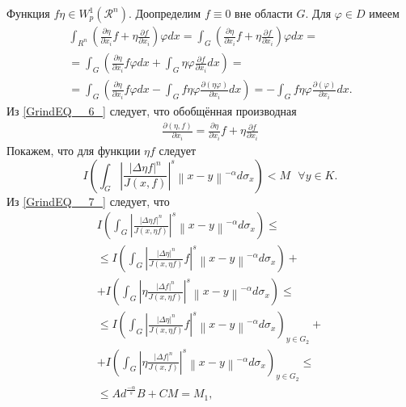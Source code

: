 Функция $f\eta \in W^1_p({\mathcal{R}}^n)$. Доопределим $f\equiv 0$ вне области $G$. Для $\varphi \in D$ имеем
\begin{equation} \label{GrindEQ__6_}
    \begin{gathered}
    \int_{R^{n} }\left(\frac{\partial \eta }{\partial x_{i} } f+\eta \frac{\partial f}{\partial x_{i} } \right) \varphi dx
    = \int _{G}\left(\frac{\partial \eta }{\partial x_{i} } f+\eta \frac{\partial f}{\partial x_{i} } \right) \varphi dx= \\
    = \int _{G}\left(\frac{\partial \eta }{\partial x_{i} } f\varphi dx+\int _{G}\eta \varphi \frac{\partial f}{\partial x_{i} } dx \right) = \\
    = \int _{G}\left(\frac{\partial \eta }{\partial x_{i} } f\varphi dx-\int _{G}f\eta \varphi \frac{\partial \left(\eta \varphi \right)}{\partial x_{i} } dx \right)
    = -\int _{G}f\eta \varphi \frac{\partial \left(\varphi \right)}{\partial x_{i}}dx.
    \end{gathered}
\end{equation}
Из \ref{GrindEQ__6_} следует, что обобщённая производная 
\begin{equation} \label{GrindEQ__7_}
    \begin{gathered}
        \frac{\partial \left(\eta ,f\right)}{\partial x_i}=\frac{\partial \eta }{\partial x_i}f+\eta \frac{\partial f}{\partial x_i}
    \end{gathered}
\end{equation}
Покажем, что для функции $\eta f$ следует
$$
I\left(\int _{G}\left|\frac{\left|\Delta \eta f\right|^{n} }{J\left(x,f\right)} \right|^{s} \left\| x-y\right\| ^{-\alpha }  d\sigma _{x} \right)<M\, \, \, \, \forall y\in K.
$$
Из \ref{GrindEQ__7_} следует, что
\begin{equation} \label{GrindEQ__8_}
    \begin{gathered}
        I\left(\int _{G}\left|\frac{\left|\Delta \eta f\right|^{n} }{J\left(x,\eta f\right)} \right|^{s} \left\| x-y\right\| ^{-\alpha }  d\sigma _{x} \right) \leqslant \\
        \leqslant I\left(\int _{G}\left|\frac{\left|\Delta \eta \right|^{n} }{J\left(x,\eta f\right)} f\right|^{s} \left\| x-y\right\| ^{-\alpha }  d\sigma _{x} \right)+ \\
        + I\left(\int _{G}\left|\eta \frac{\left|\Delta f\right|^{n} }{J\left(x,\eta f\right)} \right|^{s} \left\| x-y\right\| ^{-\alpha }  d\sigma _{x} \right)\leqslant \\
        \leqslant I\left(\int _{G}\left|\frac{\left|\Delta \eta \right|^{n} }{J\left(x,\eta f\right)} f\right|^{s} \left\| x-y\right\| ^{-\alpha } d\sigma _{x} \right)_{y\in G_{2} } + \\
        + I\left(\int _{G}\left|\eta \frac{\left|\Delta f\right|^{n} }{J\left(x,f\right)} \right|^{s} \left\| x-y\right\| ^{-\alpha }  d\sigma _{x} \right)_{y\in G_{2} } \leqslant \\
        \leqslant Ad^{\frac{-\alpha }{s} } B+CM=M_{1} ,
    \end{gathered}
\end{equation}
